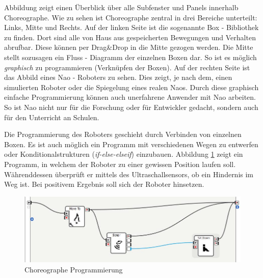 Abbildung  zeigt einen Überblick über alle Subfenster und Panels innerhalb Choreographe. Wie zu sehen ist Choreographe zentral in drei Bereiche unterteilt: Links, Mitte und Rechts.
Auf der linken Seite ist die sogenannte Box - Bibliothek zu finden. Dort sind alle von Haus aus gespeicherten Bewegungen und Verhalten abrufbar. Diese können per Drag\&Drop in die Mitte gezogen werden. Die Mitte stellt sozusagen ein Fluss - Diagramm der einzelnen Boxen dar. So ist es möglich \textit{graphisch} zu programmieren (Verknüpfen der Boxen). Auf der rechten Seite ist das Abbild eines Nao - Roboters zu sehen. Dies zeigt, je nach dem, einen simulierten Roboter oder die Spiegelung eines realen Naos. 
Durch diese graphisch einfache Programmierung können auch unerfahrene Anwender mit Nao arbeiten. So ist Nao nicht nur für die Forschung oder für Entwickler gedacht, sondern auch für den Unterricht an Schulen.

Die Programmierung des Roboters geschieht durch Verbinden von einzelnen Boxen. Es ist auch möglich ein Programm mit verschiedenen Wegen zu entwerfen oder Konditionalstrukturen (\textit{if-else-elseif}) einzubauen. Abbildung \ref{f:nao_choreographeProg} zeigt ein Programm, in welchem der Roboter zu einer gewissen Position laufen soll. Währenddessen überprüft er mittels des Ultraschallsensors, ob ein Hindernis im Weg ist. Bei positivem Ergebnis soll sich der Roboter hinsetzen.

\begin{figure}[H]						
	\centering							
	\includegraphics[scale=.7]{Bilder/choreographe_prog.jpg}			
	\caption{Choreographe Programmierung}						
	\label{f:nao_choreographeProg}						
\end{figure}

